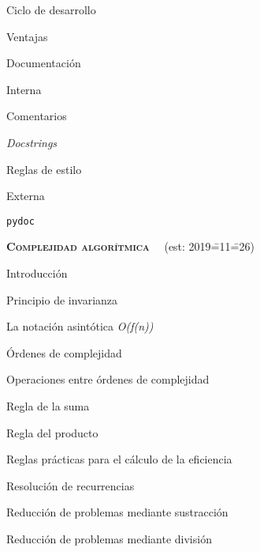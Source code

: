 \begin{longenum}
\begin{longenum}
\begin{longenum}
            \begin{longenum}
                \item Ciclo de desarrollo
                \item Ventajas
            \end{longenum}
        \end{longenum}
        \item Documentación
        \begin{longenum}
            \item Interna
            \begin{longenum}
                \item Comentarios
                \item \textit{Docstrings}
                \item Reglas de estilo
            \end{longenum}
            \item Externa
            \begin{longenum}
                \item \texttt{pydoc}
            \end{longenum}
        \end{longenum}
    \end{longenum}
    \item \textbf{\textsc{Complejidad algorítmica}} \ \opcional\ (est: 2019\==11\==26)
    \begin{longenum}
        \item Introducción
        \item Principio de invarianza
        \item La notación asintótica \textit{O(f(n))}
        \item Órdenes de complejidad
        \item Operaciones entre órdenes de complejidad
        \begin{longenum}
            \item Regla de la suma
            \item Regla del producto
        \end{longenum}
        \item Reglas prácticas para el cálculo de la eficiencia
        \item Resolución de recurrencias
        \begin{longenum}
            \item Reducción de problemas mediante sustracción
            \item Reducción de problemas mediante división

\end{longenum}
\end{longenum}
\end{longenum}

